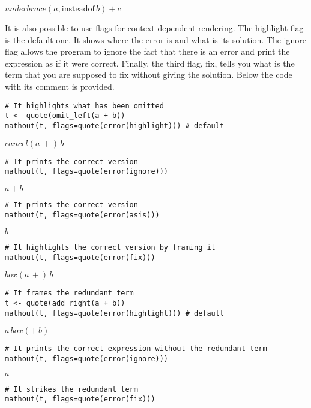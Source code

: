 \({{{underbrace}\left({{a}{,{\mathrm{instead of}{\,{b}}}}}\right)}+{c}}\)

It is also possible to use flags for context-dependent rendering. The highlight flag is the default one. It shows where the error is and what is its solution. The ignore flag allows the program to ignore the fact that there is an error and print the expression as if it were correct. Finally, the third flag, fix, tells you what is the term that you are supposed to fix without giving the solution. Below the code with its comment is provided.

\begin{verbatim}
# It highlights what has been omitted
t <- quote(omit_left(a + b))
mathout(t, flags=quote(error(highlight))) # default
\end{verbatim}

\({{{cancel}\left({{a}{\,+}}\right)}{\,{b}}}\)

\begin{verbatim}
# It prints the correct version
mathout(t, flags=quote(error(ignore)))
\end{verbatim}

\({{a}+{b}}\)

\begin{verbatim}
# It prints the correct version
mathout(t, flags=quote(error(asis)))
\end{verbatim}

\({b}\)

\begin{verbatim}
# It highlights the correct version by framing it
mathout(t, flags=quote(error(fix)))
\end{verbatim}

\({{{box}\left({{a}{\,+}}\right)}{\,{b}}}\)

\begin{verbatim}
# It frames the redundant term
t <- quote(add_right(a + b))
mathout(t, flags=quote(error(highlight))) # default
\end{verbatim}

\({{a}{\,{{box}\left({+{\,{b}}}\right)}}}\)

\begin{verbatim}
# It prints the correct expression without the redundant term
mathout(t, flags=quote(error(ignore)))
\end{verbatim}

\({a}\)

\begin{verbatim}
# It strikes the redundant term 
mathout(t, flags=quote(error(fix)))
\end{verbatim}


